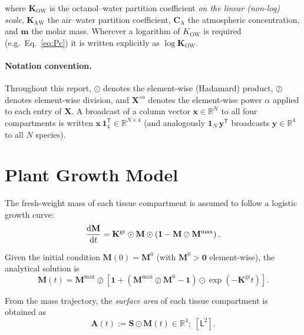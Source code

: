 \documentclass[12pt,a4paper]{article}
\newcommand{\R}{\mathbb{R}}
\newcommand{\oN}{\mathbf{1}_N}
\newcommand{\oFour}{\mathbf{1}_4}
\newcommand{\dL}{\mathsf{L}}
\begin{document}
\noindent where $\mathbf{K}_\mathrm{OW}$ is the octanol--water partition coefficient \emph{on the linear (non-log) scale}, $\mathbf{K}_\mathrm{AW}$ the air--water partition coefficient, $\mathbf{C}_\mathrm{A}$ the atmospheric concentration, and $\mathbf{m}$ the molar mass.  Wherever a logarithm of $K_\mathrm{OW}$ is required (e.g.\ Eq.~\eqref{eq:Pc}) it is written explicitly as $\log\mathbf{K}_\mathrm{OW}$.

\paragraph{Notation convention.}  Throughout this report, $\odot$ denotes the element-wise (Hadamard) product, $\oslash$ denotes element-wise division, and $\mathbf{X}^{\circ\alpha}$ denotes the element-wise power $\alpha$ applied to each entry of $\mathbf{X}$.  A broadcast of a column vector $\mathbf{x}\in\R^N$ to all four compartments is written $\mathbf{x}\,\oFour^\mathsf{T}\in\R^{N\times4}$ (and analogously $\oN\,\mathbf{y}^\mathsf{T}$ broadcasts $\mathbf{y}\in\R^4$ to all $N$ species).


\section{Plant Growth Model}\label{sec:growth}

The fresh-weight mass of each tissue compartment is assumed to follow a logistic growth curve:
\begin{equation}\label{eq:growth_ode}
    \dv{\mathbf{M}}{t} = \mathbf{K}^\mathrm{gr} \odot \mathbf{M} \odot \left(\mathbf{1} - \mathbf{M} \oslash \mathbf{M}^\mathrm{max}\right).
\end{equation}

Given the initial condition $\mathbf{M}(0)=\mathbf{M}^0$ (with $\mathbf{M}^0>\mathbf{0}$ element-wise), the analytical solution is
\begin{equation}\label{eq:growth_soln}
    \mathbf{M}(t) = \mathbf{M}^\mathrm{max} \oslash \left[\mathbf{1}+\left(\mathbf{M}^\mathrm{max}\oslash\mathbf{M}^0-\mathbf{1}\right)\odot\exp\!\left(-\mathbf{K}^\mathrm{gr}t\right)\right].
\end{equation}

From the mass trajectory, the \emph{surface area} of each tissue compartment is obtained as
\begin{equation}\label{eq:area}
    \mathbf{A}(t) := \mathbf{S}\odot \mathbf{M}(t)\in \R^4;\; [\dL^2].
\end{equation}
\end{document}
